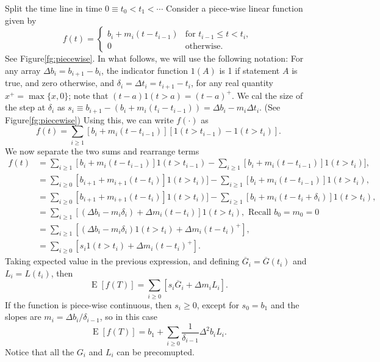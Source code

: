 \documentclass[USenglish,10pt]{article}
\newcommand{\Gb}{\overline{G}\xspace}
\DeclareMathOperator{\Exp}{E}       %
\newcommand{\E}[1]{\Exp\left[{#1}\right]}       %
\begin{document}
Split the time line in time $0\equiv t_0 < t_1 < \cdots$
Consider a piece-wise linear function given by
\[  f(t) =
	\begin{cases}
		b_i + m_i (t - t_{i-1})   & \text{for $t_{i-1} \leq t < t_i$, } \\
		0                     & \text{otherwise}.
	\end{cases}
\]
See Figure\ref{fg:piecewise}.
In what follows, we will use the following notation:
For any array $\Delta b_i = b_{i+1} - b_i$, the indicator function $1(A)$ is 1 if statement $A$ is true, and zero otherwise, and $\delta_i=\Delta t_i=t_{i+1}-t_i$, for any real quantity $x^+ = \max\{x,0\}$;
note that $(t-a)1(t>a)=(t-a)^+$.
We cal the size of the step at $\delta_i$ as $s_i\equiv b_{i+1}-(b_i + m_i(t_i-t_{i-1}))=\Delta b_i -m_i\Delta t_i$. (See Figure\ref{fg:piecewise})
Using this, we can write $f(\cdot)$ as
\[    f(t) = \sum_{i \geq 1} 	[b_i + m_i (t - t_{i-1})] [1(t>t_{i-1}) - 1(t>t_i)] .\]
We now separate the two sums and rearrange terms
\begin{align*}
f(t)
&= \sum_{i \geq 1} 	[b_i + m_i (t - t_{i-1})] 1(t>t_{i-1})  - \sum_{i \geq 1} 	[b_i + m_i (t - t_{i-1})]1(t>t_i)], \\
&= \sum_{i \geq 0} 	[b_{i+1} + m_{i+1} (t - t_{i})] 1(t>t_{i})] - \sum_{i \geq 1} 	[b_i + m_i (t - t_{i-1})] 1(t>t_i),   \\
&= \sum_{i \geq 0} 	[b_{i+1} + m_{i+1} (t - t_{i})] 1(t>t_{i})] - \sum_{i \geq 1} 	[b_i + m_i (t  -t_i + \delta_i)] 1(t>t_i),   \\
&= \sum_{i \geq 1}  \left[(\Delta b_i - m_i\delta_i) + \Delta m_i (t - t_i)\right]1(t>t_i), \text { Recall $b_0=m_0=0$}\\
&= \sum_{i \geq 1} \left[(\Delta b_i - m_i\delta_i)1(t>t_i) + \Delta m_i (t - t_i)^+ \right], \\
&= \sum_{i \geq 0} \left[s_i1(t>t_i) + \Delta m_i (t - t_i)^+ \right].
\end{align*}
Taking expected value in the previous expression, and defining $\Gb_i=\Gb(t_i)$ and $L_i=L(t_i)$, then
\[  \E{f(T)} = \sum_{i \geq 0} \left[s_i\Gb_i + \Delta m_i L_i \right].  \]
If the function is piece-wise continuous, then  $s_i \geq 0$, except for $s_0=b_1$ and the slopes are $m_i=\Delta b_i/\delta_{i-1}$, so in this case
\[  \E{f(T)} = b_1 + \sum_{i \geq 0} \frac{1}{\delta_{i-1}} \Delta^2 b_i L_i.  \]
Notice that all the $G_i$ and $L_i$ can be precomupted.
\end{document}
